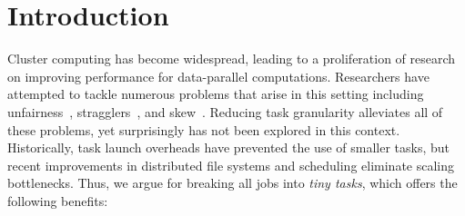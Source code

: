 \section{Introduction}
Cluster computing has become widespread, leading to a proliferation of
research on improving performance for data-parallel computations.
Researchers have attempted
to tackle numerous problems that arise in this setting
including
unfairness~\cite{ananthanarayanan2013effective,hindman2011mesos,isard2009quincy,zaharia2008improving},
stragglers~\cite{ananthanarayanan2013effective,ananthanarayanan2010reining}, and skew~\cite{ananthanarayanan2011scarlett,gufler2012load,kwon2012skewtune}.
Reducing task granularity alleviates all of these problems, yet surprisingly has
not been explored in this context.
Historically, task launch overheads have prevented the use of smaller tasks,
but recent improvements in distributed file systems and
scheduling eliminate scaling bottlenecks.
Thus, we argue for
breaking all jobs into \emph{tiny tasks}, which offers the following benefits:

